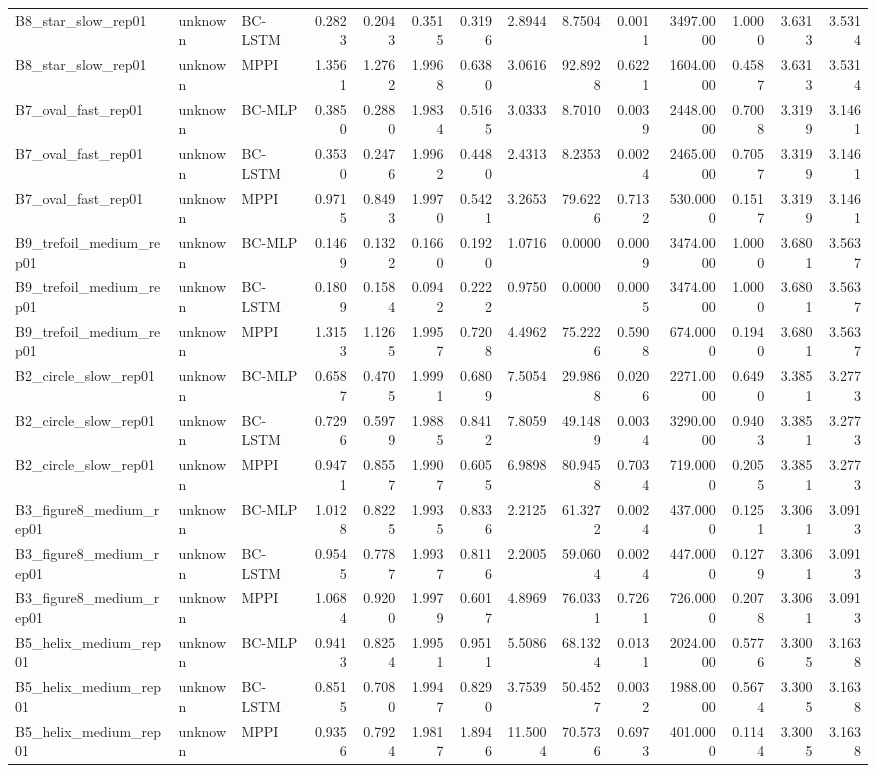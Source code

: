 \begin{tabular}{lllrrrrrrrrrrr}
B8_star_slow_rep01 & unknown & BC-LSTM & 0.2823 & 0.2043 & 0.3515 & 0.3196 & 2.8944 & 8.7504 & 0.0011 & 3497.0000 & 1.0000 & 3.6313 & 3.5314 \\
B8_star_slow_rep01 & unknown & MPPI & 1.3561 & 1.2762 & 1.9968 & 0.6380 & 3.0616 & 92.8928 & 0.6221 & 1604.0000 & 0.4587 & 3.6313 & 3.5314 \\
B7_oval_fast_rep01 & unknown & BC-MLP & 0.3850 & 0.2880 & 1.9834 & 0.5165 & 3.0333 & 8.7010 & 0.0039 & 2448.0000 & 0.7008 & 3.3199 & 3.1461 \\
B7_oval_fast_rep01 & unknown & BC-LSTM & 0.3530 & 0.2476 & 1.9962 & 0.4480 & 2.4313 & 8.2353 & 0.0024 & 2465.0000 & 0.7057 & 3.3199 & 3.1461 \\
B7_oval_fast_rep01 & unknown & MPPI & 0.9715 & 0.8493 & 1.9970 & 0.5421 & 3.2653 & 79.6226 & 0.7132 & 530.0000 & 0.1517 & 3.3199 & 3.1461 \\
B9_trefoil_medium_rep01 & unknown & BC-MLP & 0.1469 & 0.1322 & 0.1660 & 0.1920 & 1.0716 & 0.0000 & 0.0009 & 3474.0000 & 1.0000 & 3.6801 & 3.5637 \\
B9_trefoil_medium_rep01 & unknown & BC-LSTM & 0.1809 & 0.1584 & 0.0942 & 0.2222 & 0.9750 & 0.0000 & 0.0005 & 3474.0000 & 1.0000 & 3.6801 & 3.5637 \\
B9_trefoil_medium_rep01 & unknown & MPPI & 1.3153 & 1.1265 & 1.9957 & 0.7208 & 4.4962 & 75.2226 & 0.5908 & 674.0000 & 0.1940 & 3.6801 & 3.5637 \\
B2_circle_slow_rep01 & unknown & BC-MLP & 0.6587 & 0.4705 & 1.9991 & 0.6809 & 7.5054 & 29.9868 & 0.0206 & 2271.0000 & 0.6490 & 3.3851 & 3.2773 \\
B2_circle_slow_rep01 & unknown & BC-LSTM & 0.7296 & 0.5979 & 1.9885 & 0.8412 & 7.8059 & 49.1489 & 0.0034 & 3290.0000 & 0.9403 & 3.3851 & 3.2773 \\
B2_circle_slow_rep01 & unknown & MPPI & 0.9471 & 0.8557 & 1.9907 & 0.6055 & 6.9898 & 80.9458 & 0.7034 & 719.0000 & 0.2055 & 3.3851 & 3.2773 \\
B3_figure8_medium_rep01 & unknown & BC-MLP & 1.0128 & 0.8225 & 1.9935 & 0.8336 & 2.2125 & 61.3272 & 0.0024 & 437.0000 & 0.1251 & 3.3061 & 3.0913 \\
B3_figure8_medium_rep01 & unknown & BC-LSTM & 0.9545 & 0.7787 & 1.9937 & 0.8116 & 2.2005 & 59.0604 & 0.0024 & 447.0000 & 0.1279 & 3.3061 & 3.0913 \\
B3_figure8_medium_rep01 & unknown & MPPI & 1.0684 & 0.9200 & 1.9979 & 0.6017 & 4.8969 & 76.0331 & 0.7261 & 726.0000 & 0.2078 & 3.3061 & 3.0913 \\
B5_helix_medium_rep01 & unknown & BC-MLP & 0.9413 & 0.8254 & 1.9951 & 0.9511 & 5.5086 & 68.1324 & 0.0131 & 2024.0000 & 0.5776 & 3.3005 & 3.1638 \\
B5_helix_medium_rep01 & unknown & BC-LSTM & 0.8515 & 0.7080 & 1.9947 & 0.8290 & 3.7539 & 50.4527 & 0.0032 & 1988.0000 & 0.5674 & 3.3005 & 3.1638 \\
B5_helix_medium_rep01 & unknown & MPPI & 0.9356 & 0.7924 & 1.9817 & 1.8946 & 11.5004 & 70.5736 & 0.6973 & 401.0000 & 0.1144 & 3.3005 & 3.1638 \\
\bottomrule
\end{tabular}

